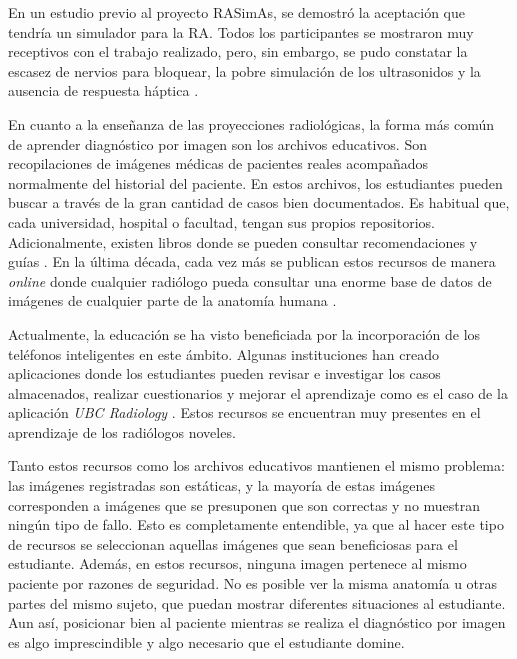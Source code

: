 En un estudio previo al proyecto \ac{RASimAs}, se demostró la aceptación que tendría un simulador para la \ac{RA}. Todos los participantes se mostraron muy receptivos con el trabajo realizado, pero, sin embargo, se pudo constatar la escasez de nervios para bloquear, la pobre simulación de los ultrasonidos y la ausencia de respuesta háptica \cite{Grottke2009594}.



En cuanto a la enseñanza de las proyecciones radiológicas, la forma más común de aprender diagnóstico por imagen son los archivos educativos. Son recopilaciones de imágenes médicas de pacientes reales acompañados normalmente del historial del paciente. En estos archivos, los estudiantes pueden buscar a través de la gran cantidad de casos bien documentados. Es habitual que, cada universidad, hospital o facultad, tengan sus propios repositorios. Adicionalmente, existen libros donde se pueden consultar recomendaciones y guías \cite{carver2012medical,manualpractico}.
En la última década, cada vez más se publican estos recursos de manera \emph{online} donde cualquier radiólogo pueda consultar una enorme base de datos de imágenes de cualquier parte de la anatomía humana \cite{deshpande2017integrated}. 

Actualmente, la educación se ha visto beneficiada por la incorporación de los teléfonos inteligentes en este ámbito. Algunas instituciones han creado aplicaciones donde los estudiantes pueden revisar e investigar los casos almacenados, realizar cuestionarios y mejorar el aprendizaje como es el caso de la aplicación \emph{UBC Radiology} \cite{Spouge2017}. Estos recursos se encuentran muy presentes en el aprendizaje de los radiólogos noveles.

Tanto estos recursos como los archivos educativos mantienen el mismo problema: las imágenes registradas son estáticas, y la mayoría de estas imágenes corresponden a imágenes que se presuponen que son correctas y no muestran ningún tipo de fallo. Esto es completamente entendible, ya que al hacer este tipo de recursos se seleccionan aquellas imágenes que sean beneficiosas para el estudiante. Además, en estos recursos, ninguna imagen pertenece al mismo paciente por razones de seguridad. No es posible ver la misma anatomía u otras partes del mismo sujeto, que puedan mostrar diferentes situaciones al estudiante. Aun así, posicionar bien al paciente mientras se realiza el diagnóstico por imagen es algo imprescindible y algo necesario que el estudiante domine. 


